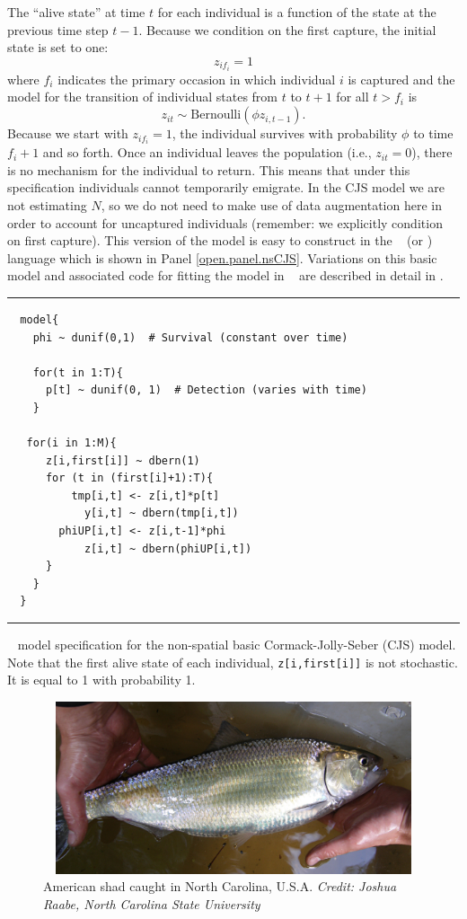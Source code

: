 The ``alive state'' at time $t$ for each individual is a
function of the state at the previous time step $t-1$.   Because
we condition on the first capture, the initial
state is set to one:
\[
 z_{i f_i} = 1
\]
where $f_i$ indicates the primary occasion in which individual $i$ is
captured and the model for the transition of individual states from $t$ to $t+1$ for
all $t > f_i$ is
\[
 z_{i t} \sim \mbox{Bernoulli}( \phi z_{i,t-1}).
\]
Because we start with $z_{i f_i} = 1$, the individual survives with
probability $\phi$ to time $f_i + 1$ and so forth.  Once an individual
leaves the population (i.e., $z_{it} = 0$), there is no mechanism for
the individual to return.  This means that under this specification
individuals cannot temporarily emigrate.  In the CJS model we are not
estimating $N$, so we do not need to make use of data augmentation
here in order to account for uncaptured individuals (remember: we
explicitly condition on first capture).  This version of the model is
easy to construct in the \bugs~ (or \jags) language which is shown in
Panel \ref{open.panel.nsCJS}.  Variations on this basic model and
associated code for fitting the model in \bugs~ are described in
detail in \citet[][Chapts. 7-9]{kery_schaub:2011}.

\begin{panel}[htp]
\centering
\rule[0.1in]{\textwidth}{.03in}
{\small
\begin{verbatim}
  model{
    phi ~ dunif(0,1)  # Survival (constant over time)
    
    for(t in 1:T){
      p[t] ~ dunif(0, 1)  # Detection (varies with time)
    }

   for(i in 1:M){
      z[i,first[i]] ~ dbern(1)
      for (t in (first[i]+1):T){
          tmp[i,t] <- z[i,t]*p[t]
            y[i,t] ~ dbern(tmp[i,t])
        phiUP[i,t] <- z[i,t-1]*phi
            z[i,t] ~ dbern(phiUP[i,t])
      }
    }
  }
\end{verbatim}
}
\rule[-0.1in]{\textwidth}{.03in}
\caption{
\jags~ model specification for the non-spatial basic
Cormack-Jolly-Seber (CJS) model. Note that the first alive state of
each individual, \mbox{\tt z[i,first[i]]} is not stochastic. It is
equal to 1 with probability 1.}
\label{open.panel.nsCJS}
\end{panel}


\begin{figure}
\centering
\includegraphics[height=2in,width=4.43in]{Ch16-Open/figs/American_Shad_Raabe.jpg}
\caption{American shad caught in North Carolina, U.S.A.  {\it
Credit: Joshua Raabe, North Carolina State University}  
}
\label{open.figs.shadpic}
\end{figure}


